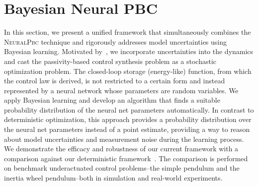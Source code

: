 
\section{Bayesian Neural PBC}

In this section, we present a unified framework that simultaneously combines
the \textsc{NeuralPbc} technique and rigorously addresses model uncertainties using
Bayesian learning.
%
Motivated by~\cite{sirichotiyakul2020data}, we incorporate uncertainties into
the dynamics and cast the passivity-based control synthesis problem as a
stochastic optimization problem.
%
The closed-loop storage (energy-like) function, from which the control law is
derived, is not restricted to a certain form and instead represented by a neural
network whose parameters are random variables.
%
%
We apply Bayesian learning and develop an algorithm that finds a suitable
probability distribution of the neural net parameters automatically.
%
In contrast to deterministic optimization, this approach provides a probability
distribution over the neural net parameters instead of a point estimate,
providing a way to reason about model uncertainties and measurement noise during
the learning process.
%
We demonstrate the efficacy and robustness of our current framework with a
comparison against our deterministic framework~\cite{sirichotiyakul2020data}.
The comparison is performed on benchmark underactuated control problems--the
simple pendulum and the inertia wheel pendulum--both in simulation and
real-world experiments. 


